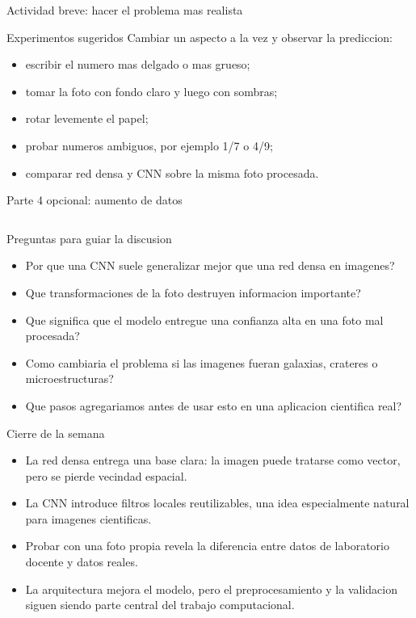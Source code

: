 \begin{frame}{Actividad breve: hacer el problema mas realista}
\begin{block}{Experimentos sugeridos}
Cambiar un aspecto a la vez y observar la prediccion:
\end{block}
\begin{itemize}
    \item escribir el numero mas delgado o mas grueso;
    \item tomar la foto con fondo claro y luego con sombras;
    \item rotar levemente el papel;
    \item probar numeros ambiguos, por ejemplo 1/7 o 4/9;
    \item comparar red densa y CNN sobre la misma foto procesada.
\end{itemize}
\end{frame}

\begin{frame}[fragile]{Parte 4 opcional: aumento de datos}
\inputminted{python}{codes/clase2-p4.py}
\end{frame}

\begin{frame}{Preguntas para guiar la discusion}
\begin{itemize}
    \item Por que una CNN suele generalizar mejor que una red densa en imagenes?
    \item Que transformaciones de la foto destruyen informacion importante?
    \item Que significa que el modelo entregue una confianza alta en una foto mal procesada?
    \item Como cambiaria el problema si las imagenes fueran galaxias, crateres o microestructuras?
    \item Que pasos agregariamos antes de usar esto en una aplicacion cientifica real?
\end{itemize}
\end{frame}

\begin{frame}{Cierre de la semana}
\begin{itemize}
    \item La red densa entrega una base clara: la imagen puede tratarse como vector, pero se pierde vecindad espacial.
    \item La CNN introduce filtros locales reutilizables, una idea especialmente natural para imagenes cientificas.
    \item Probar con una foto propia revela la diferencia entre datos de laboratorio docente y datos reales.
    \item La arquitectura mejora el modelo, pero el preprocesamiento y la validacion siguen siendo parte central del trabajo computacional.
\end{itemize}
\end{frame}


